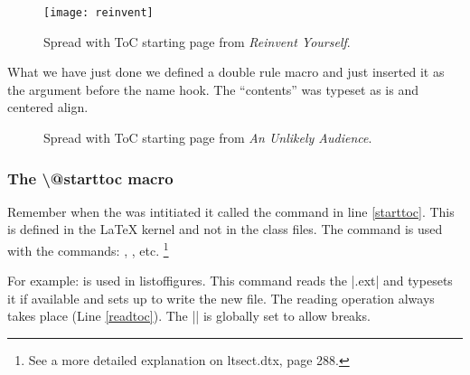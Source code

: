 \begin{figure}[htbp]
\centering
\texttt{[image: reinvent]}
\caption{Spread with ToC starting page from \textit{Reinvent Yourself}.}
\label{fig:freinvent}
\end{figure}


What we have just done we defined a double rule macro and just inserted it as the argument before the name hook. The ``contents'' was typeset as is and centered align. 


\begin{figure}[htbp]
\centering
{}
\caption{Spread with ToC starting page from \textit{An Unlikely Audience}.}
\label{fig:unlikely}
\end{figure}


\subsubsection{The \textbackslash @starttoc macro}

Remember when the \cmd{\tableofcontents} was intitiated it called the \cmd{\@starttoc} command in line \ref{starttoc}. This is defined in the LaTeX kernel and not in the class files. The  command is used with the commands:
, , etc. \footnote{See a more detailed explanation on ltsect.dtx, page 288.}

For example:  is used in listoffigures. This command
reads the |.ext| and typesets it if available and sets up to write the new file. The reading operation always takes place (Line \ref{readtoc}). The |\@nobreakfalse| is globally set to allow breaks. 

\begin{teX}
\def\@starttoc#1{%
\begingroup
  \makeatletter
  \@input{\jobname.#1}%
  \if@filesw
    \expandafter\newwrite\csname tf@#1\endcsname
    \immediate\openout \csname tf@#1\endcsname \jobname.#1\relax
   \fi
   \@nobreakfalse
\endgroup}
\end{teX}

